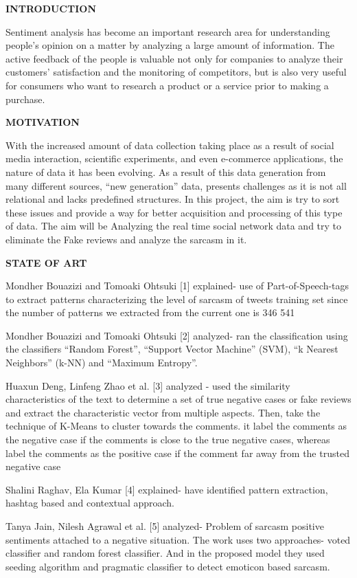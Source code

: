 \documentclass[oneside,a4paper,12pt]{book}
\begin{document}
\textbf{INTRODUCTION}
\par
Sentiment analysis has become an important research area for understanding people’s opinion on a matter by analyzing a large amount of information. The active feedback of the people is valuable not only for companies to analyze their customers’ satisfaction and the monitoring of competitors, but is also very useful for consumers who want to research a product or a service prior to making a purchase. 

\textbf{MOTIVATION}
\par
With the increased amount of data collection taking place as a result of social media interaction, scientific experiments, and even e-commerce applications, the nature of data it has been evolving. As a result of this data generation from many different sources, “new generation” data, presents challenges as it is not all relational and lacks predefined structures. In this project, the aim is try to sort these issues and provide a way for better acquisition and processing of this type of data. The aim will be Analyzing the real time social network data and try to eliminate the Fake reviews and analyze the sarcasm in it.

\textbf{STATE OF ART}
\par
Mondher Bouazizi and Tomoaki Ohtsuki [1] explained- use of Part-of-Speech-tags to extract patterns characterizing the level of sarcasm of tweets training set since the number of patterns we extracted from the current one is 346 541

Mondher Bouazizi and Tomoaki Ohtsuki [2]
 analyzed- ran the classification using the classifiers “Random Forest”, “Support Vector Machine” (SVM), “k Nearest Neighbors” (k-NN) and “Maximum Entropy”.

Huaxun Deng, Linfeng Zhao et al. [3] analyzed - used the similarity characteristics of the text to determine a set of true negative cases or fake reviews and extract the characteristic vector from multiple aspects. Then, take the technique of K-Means to cluster towards the comments. it label the comments as the negative case if the comments is close to the true negative cases, whereas label the comments as the positive case if the comment far away from the trusted negative case

Shalini Raghav, Ela Kumar [4] explained- have identified pattern extraction, hashtag based and contextual approach.

Tanya Jain, Nilesh Agrawal et al. [5] analyzed- Problem of sarcasm positive sentiments attached to a negative situation. The work uses two approaches- voted classifier and random forest classifier. And in the proposed model they used seeding algorithm and pragmatic classifier to detect emoticon based sarcasm.
\end{document}
